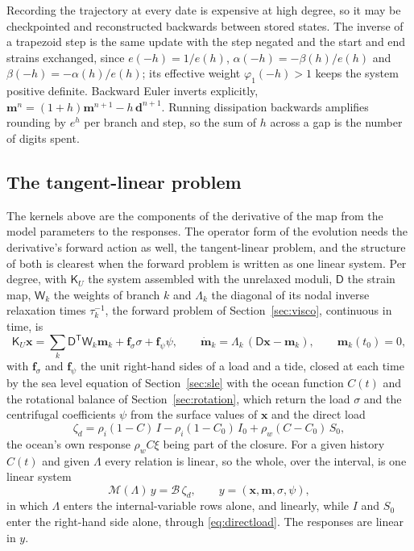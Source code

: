 \documentclass[11pt,a4paper]{article}
\numberwithin{equation}{section}
\begin{document}
Recording the trajectory at every date is expensive at high degree, so it may
be checkpointed and reconstructed backwards between stored states. The inverse
of a trapezoid step is the same update with the step negated and the start and
end strains exchanged, since $e(-h)=1/e(h)$, $\alpha(-h) = -\beta(h)/e(h)$ and
$\beta(-h) = -\alpha(h)/e(h)$; its effective weight $\varphi_{1}(-h)>1$ keeps the
system positive definite. Backward Euler inverts explicitly,
$\mathbf{m}^{n} = (1+h)\mathbf{m}^{n+1} - h\,\mathbf{d}^{n+1}$. Running dissipation
backwards amplifies rounding by $e^{h}$ per branch and step, so the sum of $h$
across a gap is the number of digits spent.

\subsection{The tangent-linear problem}
\label{sec:tangent}

The kernels above are the components of the derivative of the map from the
model parameters to the responses. The operator form of the evolution needs
the derivative's forward action as well, the tangent-linear problem, and the
structure of both is clearest when the forward problem is written as one
linear system. Per degree, with $\mathsf{K}_{U}$ the system assembled with the
unrelaxed moduli, $\mathsf{D}$ the strain map, $\mathsf{W}_{k}$ the weights of
branch $k$ and $\Lambda_{k}$ the diagonal of its nodal inverse relaxation
times $\tau_{k}^{-1}$, the forward problem of Section~\ref{sec:visco},
continuous in time, is
\begin{equation}
\mathsf{K}_{U}\mathbf{x} = \sum_{k}\mathsf{D}^{\mathsf T}\mathsf{W}_{k}\mathbf{m}_{k}
 + \mathbf{f}_{\sigma}\sigma + \mathbf{f}_{\psi}\psi,\qquad
\dot{\mathbf{m}}_{k} = \Lambda_{k}\,(\mathsf{D}\mathbf{x}-\mathbf{m}_{k}),\qquad
\mathbf{m}_{k}(t_{0}) = 0,
\label{eq:forwardlinear}
\end{equation}
with $\mathbf{f}_{\sigma}$ and $\mathbf{f}_{\psi}$ the unit right-hand sides of
a load and a tide, closed at each time by the sea level equation of
Section~\ref{sec:sle} with the ocean function $C(t)$ and the rotational
balance of Section~\ref{sec:rotation}, which return the load $\sigma$ and the
centrifugal coefficients $\psi$ from the surface values of $\mathbf{x}$ and the
direct load
\begin{equation}
\zeta_{d} = \rho_{i}(1-C)\,I - \rho_{i}(1-C_{0})\,I_{0} + \rho_{w}(C-C_{0})\,S_{0},
\label{eq:directload}
\end{equation}
the ocean's own response $\rho_{w}C\xi$ being part of the closure. For a given
history $C(t)$ and given $\Lambda$ every relation is linear, so the whole, over
the interval, is one linear system
\begin{equation}
\mathcal{M}(\Lambda)\,y = \mathcal{B}\,\zeta_{d},\qquad y = (\mathbf{x},\mathbf{m},\sigma,\psi),
\label{eq:system}
\end{equation}
in which $\Lambda$ enters the internal-variable rows alone, and linearly, while
$I$ and $S_{0}$ enter the right-hand side alone, through \eqref{eq:directload}.
The responses are linear in $y$.
\end{document}
